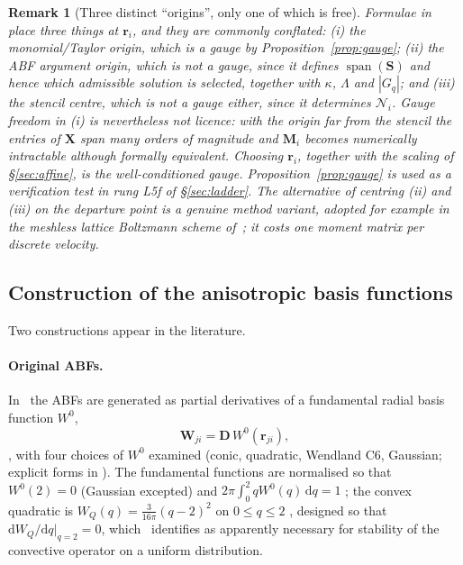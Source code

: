 \documentclass[11pt,a4paper]{article}
\newcommand{\rji}{\bm{r}_{ji}}
\newtheorem{remark}{Remark}
\begin{document}
\begin{remark}[Three distinct ``origins'', only one of which is free]
\label{rem:origins}
Formulae in~\cite{KLN2020} place three things at $\bm r_i$, and they are commonly
conflated: (i) the monomial/Taylor origin, which is a gauge by
Proposition~\ref{prop:gauge}; (ii) the ABF argument origin, which is \emph{not} a gauge,
since it defines $\operatorname{span}(\bm S)$ and hence which admissible solution is
selected, together with $\kappa$, $\Lambda$ and $|G_q|$; and (iii) the stencil centre,
which is not a gauge either, since it determines $\mathcal N_i$. Gauge freedom in (i) is
nevertheless not licence: with the origin far from the stencil the entries of $\bm X$
span many orders of magnitude and $\bm M_i$ becomes numerically intractable although
formally equivalent. Choosing $\bm r_i$, together with the scaling of
\S\ref{sec:affine}, is the well-conditioned gauge. Proposition~\ref{prop:gauge} is used
as a verification test in rung L5f of \S\ref{sec:ladder}. The alternative of centring
(ii) and (iii) on the departure point is a genuine method variant, adopted for example
in the meshless lattice Boltzmann scheme of~\cite{Strzelczyk2023}; it costs one moment
matrix per discrete velocity.
\end{remark}

\subsection{Construction of the anisotropic basis functions}
\label{sec:abf}

Two constructions appear in the literature.

\paragraph{Original ABFs.} In~\cite{KLN2020} the ABFs are generated as partial
derivatives of a fundamental radial basis function $W^{0}$,
\begin{equation}
\bm W_{ji}=\bm D\,W^{0}(\rji),
\label{eq:origABF}
\end{equation}
\cite[Eq.~(19)]{KLN2020}, with four choices of $W^{0}$ examined (conic, quadratic,
Wendland C6, Gaussian; explicit forms in \cite[Appendix A]{KLN2020}). The fundamental
functions are normalised so that $W^{0}(2)=0$ (Gaussian excepted) and
$2\pi\int_0^{2}qW^{0}(q)\,\mathrm dq=1$ \cite[Eq.~(A.1)]{KLN2020}; the convex quadratic
is $W_Q(q)=\tfrac{3}{16\pi}(q-2)^2$ on $0\le q\le2$ \cite[Eq.~(A.3)]{KLN2020}, designed
so that $\mathrm dW_Q/\mathrm dq|_{q=2}=0$, which~\cite{KLN2020} identifies as apparently
necessary for stability of the convective operator on a uniform distribution.
\end{document}
